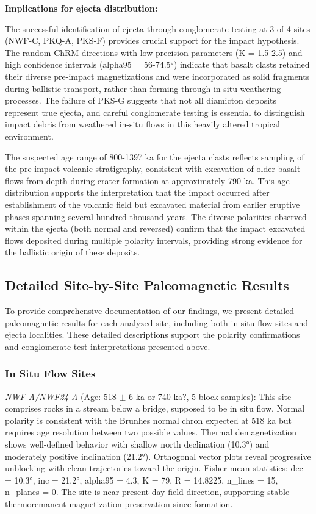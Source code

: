 \documentclass[twocolumn,11pt]{article}
\begin{document}
\textbf{Implications for ejecta distribution:}

The successful identification of ejecta through conglomerate testing at 3 of 4 sites (NWF-C, PKQ-A, PKS-F) provides crucial support for the impact hypothesis. The random ChRM directions with low precision parameters (K = 1.5-2.5) and high confidence intervals (alpha95 = 56-74.5°) indicate that basalt clasts retained their diverse pre-impact magnetizations and were incorporated as solid fragments during ballistic transport, rather than forming through in-situ weathering processes. The failure of PKS-G suggests that not all diamicton deposits represent true ejecta, and careful conglomerate testing is essential to distinguish impact debris from weathered in-situ flows in this heavily altered tropical environment.

The suspected age range of 800-1397 ka for the ejecta clasts reflects sampling of the pre-impact volcanic stratigraphy, consistent with excavation of older basalt flows from depth during crater formation at approximately 790 ka. This age distribution supports the interpretation that the impact occurred after establishment of the volcanic field but excavated material from earlier eruptive phases spanning several hundred thousand years. The diverse polarities observed within the ejecta (both normal and reversed) confirm that the impact excavated flows deposited during multiple polarity intervals, providing strong evidence for the ballistic origin of these deposits.

\subsection{Detailed Site-by-Site Paleomagnetic Results}

To provide comprehensive documentation of our findings, we present detailed paleomagnetic results for each analyzed site, including both in-situ flow sites and ejecta localities. These detailed descriptions support the polarity confirmations and conglomerate test interpretations presented above.

\subsubsection{In Situ Flow Sites}

\textit{NWF-A/NWF24-A} (Age: 518 $\pm$ 6 ka or 740 ka?, 5 block samples): This site comprises rocks in a stream below a bridge, supposed to be in situ flow. Normal polarity is consistent with the Brunhes normal chron expected at 518 ka but requires age resolution between two possible values. Thermal demagnetization shows well-defined behavior with shallow north declination (10.3°) and moderately positive inclination (21.2°). Orthogonal vector plots reveal progressive unblocking with clean trajectories toward the origin. Fisher mean statistics: dec = 10.3°, inc = 21.2°, alpha95 = 4.3, K = 79, R = 14.8225, n\_lines = 15, n\_planes = 0. The site is near present-day field direction, supporting stable thermoremanent magnetization preservation since formation.
\end{document}
